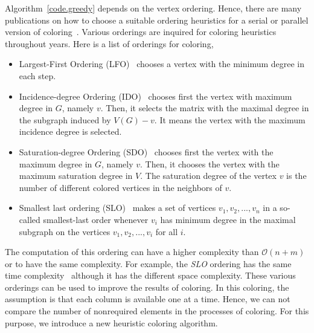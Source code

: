 \documentclass[12pt, oneside]{book}
\newcommand{\coderef}[1]{Algorithm~\protect\ref{#1}}
\begin{document}
\coderef{code.greedy} depends on the vertex ordering. 
Hence, there are many publications on how to choose a suitable ordering heuristics for a serial or parallel version of coloring~\cite{ordering1,ordering2,ordering3}.
Various orderings are inquired for coloring heuristics
throughout years. Here is a list of orderings for coloring,
\begin{itemize}
\item Largest-First Ordering (LFO)~\cite{LFO} chooses a vertex with the minimum degree in each step.
\item Incidence-degree Ordering (IDO)~\cite{IDO} chooses first the vertex with maximum degree in $G$, namely $v$. Then, it selects the matrix with the maximal degree in the subgraph induced by $V(G)-v$. It means the vertex with the maximum incidence degree is selected.
\item Saturation-degree Ordering (SDO)~\cite{SDO} chooses first the vertex with the maximum degree in $G$, namely $v$. Then, it chooses the vertex with the maximum saturation degree in
$V$. The saturation degree of the vertex $v$ is the number of different colored vertices in the neighbors of $v$.
\item Smallest last ordering (SLO)~\cite{ordering1} makes a set of vertices ${v_1,v_2,...,v_n}$ in a so-called smallest-last
order whenever $v_i$ has minimum degree in the maximal subgraph on the vertices $v_1,v_2,...,v_i$ for all $i$.
\end{itemize}
The computation of this ordering can have a higher complexity than $\mathcal{O}(n+m)$ or to have the same complexity. For example, the \textit{SLO} ordering has the same time complexity~\cite{ordering1} although it has the different space complexity.
These various orderings can be used to improve the results of coloring. 
In this coloring, the assumption is that each column is available one at a time. Hence, we can not compare the number of nonrequired elements in the processes of coloring. For this purpose, we introduce a new heuristic coloring algorithm.
\end{document}
